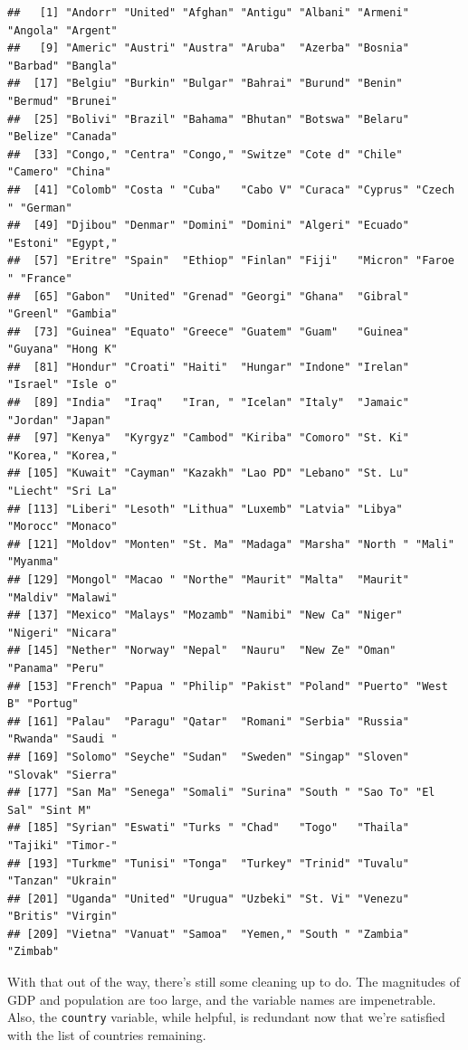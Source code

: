 \documentclass[
  12pt,
  oneside,openany]{book}
\begin{document}
\begin{verbatim}
##   [1] "Andorr" "United" "Afghan" "Antigu" "Albani" "Armeni" "Angola" "Argent"
##   [9] "Americ" "Austri" "Austra" "Aruba"  "Azerba" "Bosnia" "Barbad" "Bangla"
##  [17] "Belgiu" "Burkin" "Bulgar" "Bahrai" "Burund" "Benin"  "Bermud" "Brunei"
##  [25] "Bolivi" "Brazil" "Bahama" "Bhutan" "Botswa" "Belaru" "Belize" "Canada"
##  [33] "Congo," "Centra" "Congo," "Switze" "Cote d" "Chile"  "Camero" "China" 
##  [41] "Colomb" "Costa " "Cuba"   "Cabo V" "Curaca" "Cyprus" "Czech " "German"
##  [49] "Djibou" "Denmar" "Domini" "Domini" "Algeri" "Ecuado" "Estoni" "Egypt,"
##  [57] "Eritre" "Spain"  "Ethiop" "Finlan" "Fiji"   "Micron" "Faroe " "France"
##  [65] "Gabon"  "United" "Grenad" "Georgi" "Ghana"  "Gibral" "Greenl" "Gambia"
##  [73] "Guinea" "Equato" "Greece" "Guatem" "Guam"   "Guinea" "Guyana" "Hong K"
##  [81] "Hondur" "Croati" "Haiti"  "Hungar" "Indone" "Irelan" "Israel" "Isle o"
##  [89] "India"  "Iraq"   "Iran, " "Icelan" "Italy"  "Jamaic" "Jordan" "Japan" 
##  [97] "Kenya"  "Kyrgyz" "Cambod" "Kiriba" "Comoro" "St. Ki" "Korea," "Korea,"
## [105] "Kuwait" "Cayman" "Kazakh" "Lao PD" "Lebano" "St. Lu" "Liecht" "Sri La"
## [113] "Liberi" "Lesoth" "Lithua" "Luxemb" "Latvia" "Libya"  "Morocc" "Monaco"
## [121] "Moldov" "Monten" "St. Ma" "Madaga" "Marsha" "North " "Mali"   "Myanma"
## [129] "Mongol" "Macao " "Northe" "Maurit" "Malta"  "Maurit" "Maldiv" "Malawi"
## [137] "Mexico" "Malays" "Mozamb" "Namibi" "New Ca" "Niger"  "Nigeri" "Nicara"
## [145] "Nether" "Norway" "Nepal"  "Nauru"  "New Ze" "Oman"   "Panama" "Peru"  
## [153] "French" "Papua " "Philip" "Pakist" "Poland" "Puerto" "West B" "Portug"
## [161] "Palau"  "Paragu" "Qatar"  "Romani" "Serbia" "Russia" "Rwanda" "Saudi "
## [169] "Solomo" "Seyche" "Sudan"  "Sweden" "Singap" "Sloven" "Slovak" "Sierra"
## [177] "San Ma" "Senega" "Somali" "Surina" "South " "Sao To" "El Sal" "Sint M"
## [185] "Syrian" "Eswati" "Turks " "Chad"   "Togo"   "Thaila" "Tajiki" "Timor-"
## [193] "Turkme" "Tunisi" "Tonga"  "Turkey" "Trinid" "Tuvalu" "Tanzan" "Ukrain"
## [201] "Uganda" "United" "Urugua" "Uzbeki" "St. Vi" "Venezu" "Britis" "Virgin"
## [209] "Vietna" "Vanuat" "Samoa"  "Yemen," "South " "Zambia" "Zimbab"
\end{verbatim}

With that out of the way, there's still some cleaning up to do. The magnitudes of GDP and population are too large, and the variable names are impenetrable. Also, the \texttt{country} variable, while helpful, is redundant now that we're satisfied with the list of countries remaining.
\end{document}
